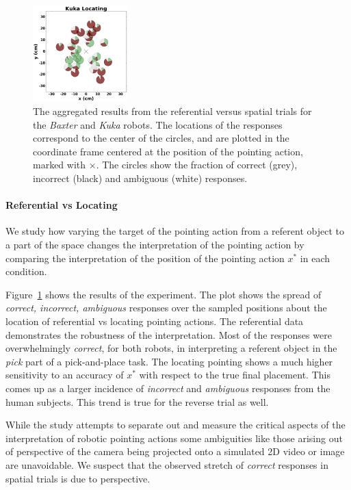\documentclass[letterpaper]{article} %
\begin{document}
\begin{figure}[ht!]
    \includegraphics[width=0.325\textwidth ]{kuka_Locating_.png}
    \caption{The aggregated results from the referential versus spatial trials for the \textit{Baxter} and \textit{Kuka} robots. The locations of the responses correspond to the center of the circles, and are plotted in the coordinate frame centered at the position of the pointing action, marked with $\times$. The circles show the fraction of correct (grey), incorrect (black) and ambiguous (white) responses.}
    \label{fig:aggregatesimple}
\end{figure}

\paragraph{Referential vs Locating}
We study how varying the target of the pointing action from a referent object to a part of the space changes the interpretation of the pointing action by comparing the interpretation of the position of the pointing action $x^*$ in each condition. 

Figure~\ref{fig:aggregatesimple} shows the results of the experiment. The plot shows the spread of \textit{correct, incorrect, ambiguous} responses over the sampled positions about the location of referential vs locating pointing actions. The referential data demonstrates the robustness of the interpretation. Most of the responses were overwhelmingly \textit{correct}, for both robots, in interpreting a referent object in the \textit{pick} part of a pick-and-place task. The locating pointing shows a much higher sensitivity to an accuracy of $x^*$ with respect to the true final placement. This comes up as a larger incidence of \textit{incorrect} and \textit{ambiguous} responses from the human subjects. This trend is true for the reverse trial as well.

While the study attempts to separate out and measure the critical aspects of the interpretation of robotic pointing actions some ambiguities like those arising out of perspective of the camera being projected onto a simulated 2D video or image are unavoidable. We suspect that the observed stretch of \textit{correct} responses in spatial trials is due to perspective.
\end{document}
